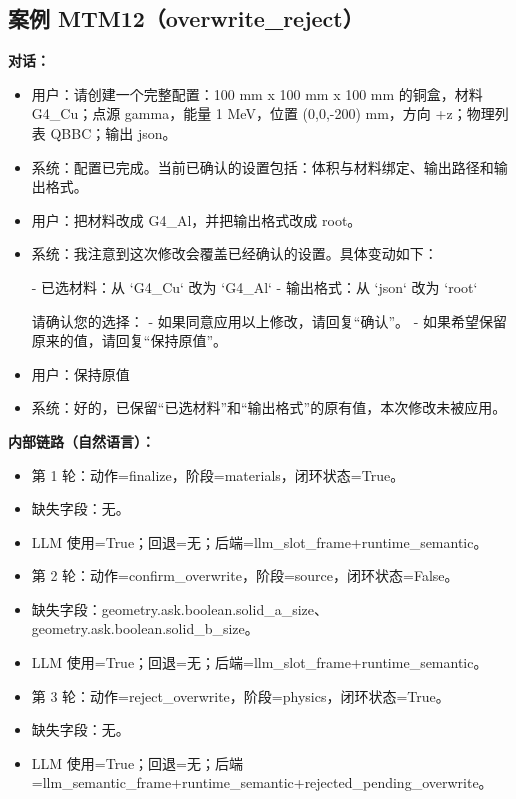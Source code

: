 \documentclass[11pt]{ctexart}
\begin{document}
\subsection{案例 MTM12（overwrite\_reject）}
\textbf{对话：}
\begin{itemize}
\item 用户：请创建一个完整配置：100 mm x 100 mm x 100 mm 的铜盒，材料 G4\_Cu；点源 gamma，能量 1 MeV，位置 (0,0,-200) mm，方向 +z；物理列表 QBBC；输出 json。
\item 系统：配置已完成。当前已确认的设置包括：体积与材料绑定、输出路径和输出格式。
\item 用户：把材料改成 G4\_Al，并把输出格式改成 root。
\item 系统：我注意到这次修改会覆盖已经确认的设置。具体变动如下：

- 已选材料：从 `G4\_Cu` 改为 `G4\_Al`
- 输出格式：从 `json` 改为 `root`

请确认您的选择：
- 如果同意应用以上修改，请回复“确认”。
- 如果希望保留原来的值，请回复“保持原值”。
\item 用户：保持原值
\item 系统：好的，已保留“已选材料”和“输出格式”的原有值，本次修改未被应用。
\end{itemize}
\textbf{内部链路（自然语言）：}
\begin{itemize}
\item 第 1 轮：动作=finalize，阶段=materials，闭环状态=True。
\item 缺失字段：无。
\item LLM 使用=True；回退=无；后端=llm\_slot\_frame+runtime\_semantic。
\item 第 2 轮：动作=confirm\_overwrite，阶段=source，闭环状态=False。
\item 缺失字段：geometry.ask.boolean.solid\_a\_size、geometry.ask.boolean.solid\_b\_size。
\item LLM 使用=True；回退=无；后端=llm\_slot\_frame+runtime\_semantic。
\item 第 3 轮：动作=reject\_overwrite，阶段=physics，闭环状态=True。
\item 缺失字段：无。
\item LLM 使用=True；回退=无；后端=llm\_semantic\_frame+runtime\_semantic+rejected\_pending\_overwrite。
\end{itemize}
\end{document}
